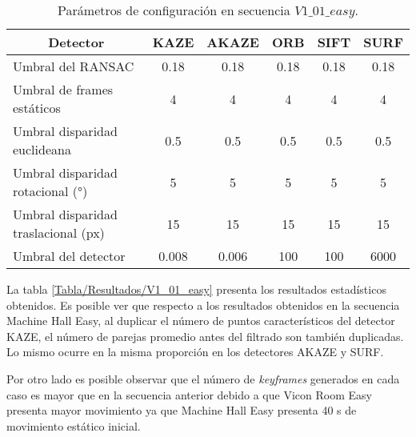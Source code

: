 \begin{table}[H]
	\caption{Parámetros de configuración en secuencia $V1\_01\_easy$.}
	\begin{tabular}{|l|c|c|c|c|c|}
		\hline
		\multicolumn{1}{|c|}{\textbf{Detector}} & \textbf{KAZE} & \textbf{AKAZE} & \textbf{ORB} & \textbf{SIFT} & \textbf{SURF} \\ \hline
		Umbral del RANSAC & 0.18 & 0.18 & 0.18 & 0.18 & 0.18 \\ \hline
		Umbral de frames estáticos & 4 & 4 & 4 & 4 & 4 \\ \hline
		Umbral disparidad euclideana & 0.5 & 0.5 & 0.5 & 0.5 & 0.5 \\ \hline
		Umbral disparidad rotacional (°) & 5 & 5 & 5 & 5 & 5 \\ \hline
		Umbral disparidad traslacional (px) & 15 & 15 & 15 & 15 & 15 \\ \hline
		Umbral del detector & 0.008 & 0.006 & 100 & 100 & 6000 \\ \hline
	\end{tabular}
	\label{Tabla/Parametros/V1_01_easy}
\end{table}

La tabla \ref{Tabla/Resultados/V1_01_easy}  presenta los resultados estadísticos  obtenidos. Es posible ver que respecto a los resultados obtenidos en la secuencia Machine Hall Easy, al duplicar el número de puntos característicos del detector KAZE, el número de parejas promedio antes del filtrado son también duplicadas. Lo mismo ocurre en la misma proporción en los detectores AKAZE y SURF. 

Por otro lado es posible observar que el número de \textit{keyframes} generados en cada caso es mayor que en la secuencia anterior debido a que Vicon Room Easy presenta mayor movimiento ya que Machine Hall Easy presenta 40 s de movimiento estático inicial. 

